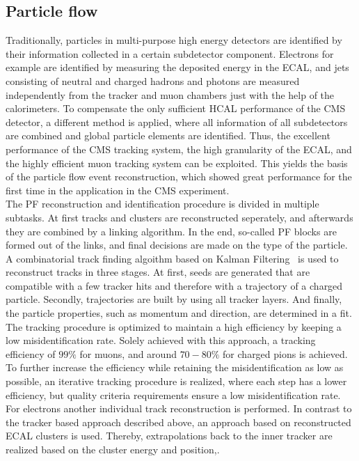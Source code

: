 \subsection{Particle flow}
Traditionally, particles in multi-purpose high energy detectors are identified by their information collected in a certain subdetector component. Electrons for example are identified by measuring the deposited energy in the ECAL, and jets consisting of neutral and charged hadrons and photons are measured independently from the tracker and muon chambers just with the help of the calorimeters. To compensate the only sufficient HCAL performance of the CMS detector, a different method is applied, where all information of all subdetectors are combined and global particle elements are identified. Thus, the excellent performance of the CMS tracking system, the high granularity of the ECAL, and the highly efficient muon tracking system can be exploited. This yields the basis of the particle flow event reconstruction, which showed great performance for the first time in the application in the CMS experiment.\\
The PF reconstruction and identification procedure is divided in multiple subtasks. At first tracks and clusters are reconstructed seperately, and afterwards they are combined by a linking algorithm. In the end, so-called PF blocks are formed out of the links, and final decisions are made on the type of the particle.\\
A combinatorial track finding algoithm based on Kalman Filtering~\cite{Kalman} is used to reconstruct tracks in three stages. At first, seeds are generated that are compatible with a few tracker hits and therefore with a trajectory of a charged particle. Secondly, trajectories are built by using all tracker layers. And finally, the particle properties, such as momentum and direction, are determined in a fit. The tracking procedure is optimized to maintain a high efficiency by keeping a low misidentification rate. Solely achieved with this approach, \eg a tracking efficiency of $99\%$ for muons, and around $70-80\%$ for charged pions is achieved. To further increase the efficiency while retaining the misidentification as low as possible, an iterative tracking procedure is realized, where each step has a lower efficiency, but quality criteria requirements ensure a low misidentification rate.\\
For electrons another individual track reconstruction is performed. In contrast to the tracker based approach described above, an approach based on reconstructed ECAL clusters is used. Thereby, extrapolations back to the inner tracker are realized based on the cluster energy and position,.\\

